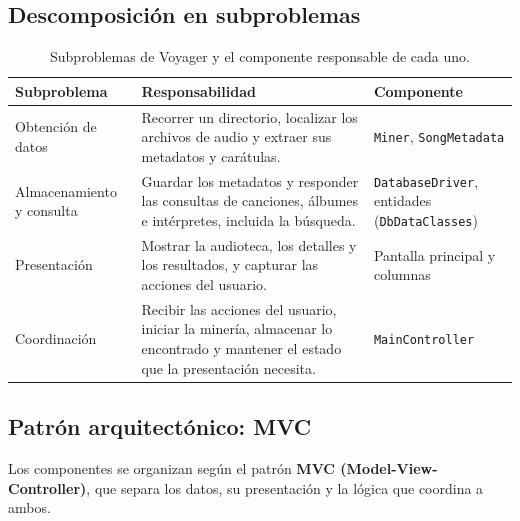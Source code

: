 \documentclass[12pt,a4paper]{article}
\begin{document}
\subsection{Descomposición en subproblemas}
\begin{table}[H]
  \centering
  \renewcommand{\arraystretch}{1.3}
  \begin{tabular}{|p{3.2cm}|p{7.2cm}|p{3.6cm}|}
    \hline
    \textbf{Subproblema} & \textbf{Responsabilidad} & \textbf{Componente} \\
    \hline
    Obtención de datos & Recorrer un directorio, localizar los archivos de audio y extraer sus metadatos y carátulas. & \texttt{Miner}, \texttt{SongMetadata} \\
    \hline
    Almacenamiento y consulta & Guardar los metadatos y responder las consultas de canciones, álbumes e intérpretes, incluida la búsqueda. & \texttt{DatabaseDriver}, entidades (\texttt{DbDataClasses}) \\
    \hline
    Presentación & Mostrar la audioteca, los detalles y los resultados, y capturar las acciones del usuario. & Pantalla principal y columnas \\
    \hline
    Coordinación & Recibir las acciones del usuario, iniciar la minería, almacenar lo encontrado y mantener el estado que la presentación necesita. & \texttt{MainController} \\
    \hline
  \end{tabular}
  \caption{Subproblemas de Voyager y el componente responsable de cada uno.}
  \label{tab:subproblemas}
\end{table}
 
\subsection{Patrón arquitectónico: MVC}
Los componentes se organizan según el patrón \textbf{MVC (Model-View-Controller)}, que separa los datos, su presentación y la lógica que coordina a ambos.
 
\end{document}
